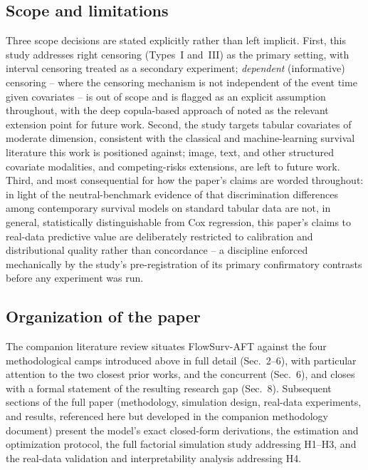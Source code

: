 \documentclass[11pt]{article}
\begin{document}
\subsection{Scope and limitations}
\label{sec:scope}

Three scope decisions are stated explicitly rather than left implicit.
First, this study addresses right censoring (Types~I and~III) as the
primary setting, with interval censoring treated as a secondary
experiment; \emph{dependent} (informative) censoring -- where the
censoring mechanism is not independent of the event time given covariates
-- is out of scope and is flagged as an explicit assumption throughout,
with the deep copula-based approach of \citet{gharari2023copula} noted as
the relevant extension point for future work. Second, the study targets
tabular covariates of moderate dimension, consistent with the classical
and machine-learning survival literature this work is positioned
against; image, text, and other structured covariate modalities, and
competing-risks extensions, are left to future work. Third, and most
consequential for how the paper's claims are worded throughout: in light
of the neutral-benchmark evidence of \citet{burk2024neutral} that
discrimination differences among contemporary survival models on
standard tabular data are not, in general, statistically distinguishable
from Cox regression, this paper's claims to real-data predictive value
are deliberately restricted to calibration and distributional quality
rather than concordance -- a discipline enforced mechanically by the
study's pre-registration of its primary confirmatory contrasts before
any experiment was run.

\subsection{Organization of the paper}
\label{sec:organization}

The companion literature review situates FlowSurv-AFT against the four
methodological camps introduced above in full detail (Sec.~2--6), with
particular attention to the two closest prior works,
\citet{ausset2021flows} and the concurrent \citet{licai2026} (Sec.~6),
and closes with a formal statement of the resulting research gap (Sec.~8).
Subsequent sections of the full paper (methodology, simulation design,
real-data experiments, and results, referenced here but developed in the
companion methodology document) present the model's exact closed-form
derivations, the estimation and optimization protocol, the full factorial
simulation study addressing H1--H3, and the real-data validation and
interpretability analysis addressing H4.



\end{document}
